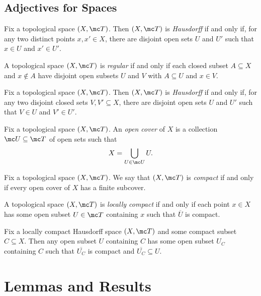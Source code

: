 \documentclass{article}
\begin{document}
\subsection{Adjectives for Spaces}
\begin{definition}[Hausdroff]
	Fix a topological space $(X,\mc T)$. Then $(X,\mc T)$ is \textit{Hausdorff} if and only if, for any two distinct points $x,x'\in X$, there are disjoint open sets $U$ and $U'$ such that $x\in U$ and $x'\in U'$.
\end{definition}
\begin{definition}[Regular]
	A topological space $(X,\mc T)$ is \textit{regular} if and only if each closed subset $A\subseteq X$ and $x\notin A$ have disjoint open subsets $U$ and $V$ with $A\subseteq U$ and $x\in V$.
\end{definition}
\begin{definition}[Normal]
	Fix a topological space $(X,\mc T)$. Then $(X,\mc T)$ is \textit{Hausdorff} if and only if, for any two disjoint closed sets $V,V'\subseteq X$, there are disjoint open sets $U$ and $U'$ such that $V\in U$ and $V'\in U'$.
\end{definition}
\begin{definition}
	Fix a topological space $(X,\mc T)$. An \textit{open cover} of $X$ is a collection $\mc U\subseteq\mc T$ of open sets such that
	\[X=\bigcup_{U\in\mc U}U.\]
\end{definition}
\begin{defi}[Compact]
	Fix a topological space $(X,\mc T)$. We say that $(X,\mc T)$ is \textit{compact} if and only if every open cover of $X$ has a finite subcover.
\end{defi}
\begin{definition}
	A topological space $(X,\mc T)$ is \textit{locally compact} if and only if each point $x\in X$ has some open subset $U\in\mc T$ containing $x$ such that $\overline U$ is compact.
\end{definition}
\begin{proposition} \label{prop:best-loc-compact}
	Fix a locally compact Hausdorff space $(X,\mc T)$ and some compact subset $C\subseteq X$. Then any open subset $U$ containing $C$ has some open subset $U_C$ containing $C$ such that $\overline{U_C}$ is compact and $\overline{U_C}\subseteq U$.
\end{proposition}

\newpage
\section{Lemmas and Results}
\end{document}
